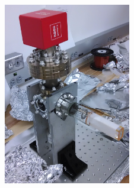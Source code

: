\documentclass{beamer}
\begin{document}
\begin{frame}
\end{frame}

\begin{frame}
  \begin{center}
    \includegraphics[height=8cm]{chamber.jpg}
  \end{center}
\end{frame}
\end{document}
